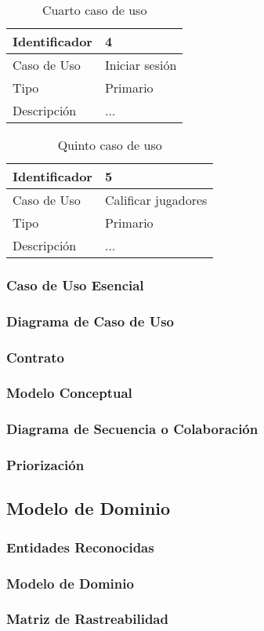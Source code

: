 \begin{table}[H]
    \begin{center}
        \begin{tabular}{| l | m{12cm} |}        
        	\hline 
        	Identificador & 4\\
        	\hline
        	Caso de Uso & Iniciar sesión\\
        	\hline
        	Tipo & Primario\\
        	\hline
        	Descripción &...\\
        	\hline
        \end{tabular}
    \caption{Cuarto caso de uso}
    \end{center}
\end{table}

\begin{table}[H]
    \begin{center}
        \begin{tabular}{| l | m{12cm} |}        
        	\hline 
        	Identificador & 5\\
        	\hline
        	Caso de Uso & Calificar jugadores\\
        	\hline
        	Tipo & Primario\\
        	\hline
        	Descripción & ...\\
        	\hline
        \end{tabular}
    \caption{Quinto caso de uso}
    \end{center}
\end{table}
\subsubsection{Caso de Uso Esencial}
\subsubsection{Diagrama de Caso de Uso}
\subsubsection{Contrato}
\subsubsection{Modelo Conceptual}
\subsubsection{Diagrama de Secuencia o Colaboración}
\subsubsection{Priorización}

\subsection{Modelo de Dominio}
\subsubsection{Entidades Reconocidas}
\subsubsection{Modelo de Dominio}
\subsubsection{Matriz de Rastreabilidad}